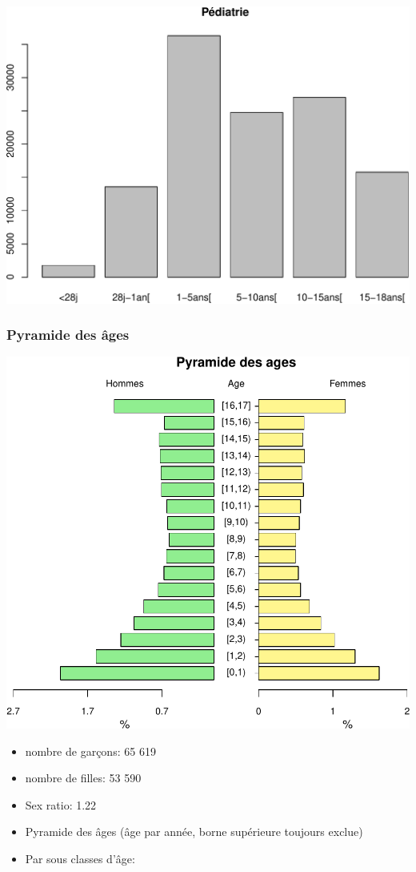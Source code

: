 \documentclass[]{article}
\begin{document}
\includegraphics{rapport2014_V4_files/figure-latex/unnamed-chunk-9-1.pdf}

\subsubsection{Pyramide des âges}\label{pyramide-des-ages}

\includegraphics{rapport2014_V4_files/figure-latex/unnamed-chunk-10-1.pdf}

\begin{itemize}
\itemsep1pt\parskip0pt
\item
  nombre de garçons: 65 619
\item
  nombre de filles: 53 590
\item
  Sex ratio: 1.22
\item
  Pyramide des âges (âge par année, borne supérieure toujours exclue)
\item
  Par sous classes d'âge:
\end{itemize}
\end{document}
